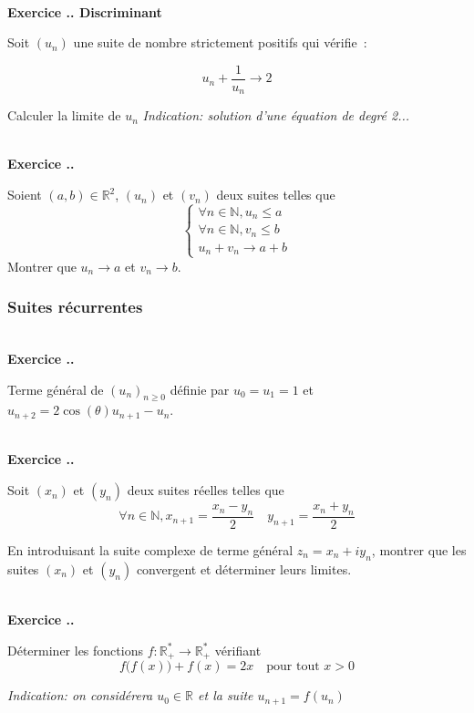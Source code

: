 \documentclass{article}
\newcommand{\mb}[1]{\mathbb{#1}}
\newcounter{exo}
\newcommand{\exercice}[1][\null]{\textbf{\\ Exercice \thesection.\theexo. #1} \addtocounter{exo}{1}}
\begin{document}
\exercice[Discriminant]

Soit $(u_n)$ une suite de nombre strictement positifs 
qui vérifie~:

\begin{equation*}
    u_n + \frac{1}{u_n} \rightarrow 2
\end{equation*}

Calculer la limite de $u_n$ \emph{Indication: solution d'une équation de degré
2...}

\exercice

Soient $(a,b) \in \mb{R}^{2}$, $(u_{n})$ et $(v_{n})$ deux suites telles que
\begin{equation*}
    \begin{cases}
        \forall n \in \mb{N}, u_n \leq a \\
        \forall n \in \mb{N}, v_n \leq b \\
        u_n + v_n \to a + b
    \end{cases}
\end{equation*}
Montrer que $u_{n} \to a$ et $v_{n} \to b$.


\subsubsection{Suites récurrentes}

\exercice

Terme général de $(u_n)_{n \ge 0}$ définie par $u_0 = u_1 = 1$ et $u_{n+2} = 2 \cos(\theta) u_{n+1} - u_n$.

\exercice

Soit $(x_{n})$ et $(y_{n})$ deux suites réelles telles que
\begin{equation*}
    \forall n \in \mb{N}, x_{n + 1} = \frac{x_{n} - y_{n}}{2} \quad  y_{n + 1} = \frac{x_{n} + y_{n}}{2}
\end{equation*}

En introduisant la suite complexe de terme général $z_{n} = x_{n} + i y_{n}$, 
montrer que les suites $(x_{n})$ et $(y_{n})$ convergent et déterminer leurs limites.

\exercice

Déterminer les fonctions $f\colon \mb{R}_{ + }^{*} \to \mb{R}_{ + }^{*}$ vérifiant
\begin{equation*}
  f\bigl(f(x)\bigr) + f(x) = 2x  \quad\text{pour tout $x>0$}
\end{equation*}

\emph{Indication: on considérera $u_0 \in \mb{R}$ et la suite $u_{n+1} =
f(u_n)$}
\end{document}
